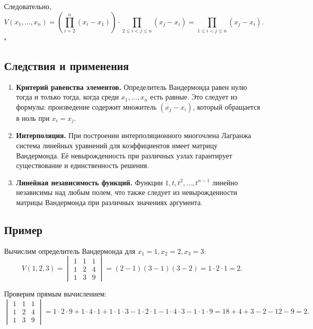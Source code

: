 \documentclass[a4paper,12pt]{article}
\theoremstyle{definition}
\theoremstyle{plain}
\theoremstyle{remark}
\begin{document}
	Следовательно,
	\[
	V(x_1, \dots, x_n) = \left( \prod_{i=2}^n (x_i - x_1) \right) \cdot \prod_{2 \leq i < j \leq n} (x_j - x_i) = \prod_{1 \leq i < j \leq n} (x_j - x_i).
	\]
	\hfill \(\square\)
	
	\subsection{Следствия и применения}
	
	\begin{enumerate}
		\item \textbf{Критерий равенства элементов.} Определитель Вандермонда равен нулю тогда и только тогда, когда среди \(x_1, \dots, x_n\) есть равные. Это следует из формулы: произведение содержит множитель \((x_j - x_i)\), который обращается в ноль при \(x_i = x_j\).
		
		\item \textbf{Интерполяция.} При построении интерполяционного многочлена Лагранжа система линейных уравнений для коэффициентов имеет матрицу Вандермонда. Её невырожденность при различных узлах гарантирует существование и единственность решения.
		
		\item \textbf{Линейная независимость функций.} Функции \(1, t, t^2, \dots, t^{n-1}\) линейно независимы над любым полем, что также следует из невырожденности матрицы Вандермонда при различных значениях аргумента.
	\end{enumerate}
	
	\subsection{Пример}
	
	Вычислим определитель Вандермонда для \(x_1 = 1, x_2 = 2, x_3 = 3\):
	\[
	V(1,2,3) = 
	\begin{vmatrix}
		1 & 1 & 1 \\
		1 & 2 & 4 \\
		1 & 3 & 9
	\end{vmatrix}
	= (2-1)(3-1)(3-2) = 1 \cdot 2 \cdot 1 = 2.
	\]
	
	Проверим прямым вычислением:
	\[
	\begin{vmatrix}
		1 & 1 & 1 \\
		1 & 2 & 4 \\
		1 & 3 & 9
	\end{vmatrix}
	= 1\cdot2\cdot9 + 1\cdot4\cdot1 + 1\cdot1\cdot3 - 1\cdot2\cdot1 - 1\cdot4\cdot3 - 1\cdot1\cdot9 = 18 + 4 + 3 - 2 - 12 - 9 = 2.
	\]
	
\end{document}
